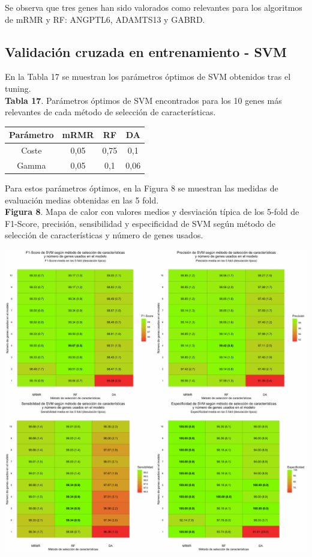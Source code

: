 Se observa que tres genes han sido valorados como relevantes para los algoritmos de mRMR y RF:  ANGPTL6, ADAMTS13 y GABRD.

\subsection{Validación cruzada en entrenamiento - SVM}

En la Tabla 17 se muestran los parámetros óptimos de SVM obtenidos tras el tuning.\\

\textbf{Tabla 17}. Parámetros óptimos de SVM encontrados para los 10 genes más relevantes de cada método de selección de características.

\begin{table}[H]
	\centering
	\begin{tabular}{cccc}
		\hline
		\textbf{Parámetro} & \textbf{mRMR} & \textbf{RF} & \textbf{DA} \\ \hline
		Coste                &    0,05 &    0,75     &   0,1       \\
		Gamma               &     0,05    &     0,1   & 0,06        \\ \hline
	\end{tabular}
\end{table}

Para estos parámetros óptimos, en la Figura 8 se muestran las medidas de evaluación medias obtenidas en las 5 fold.\\

\newpage
\textbf{Figura 8}. Mapa de calor con valores medios y desviación típica de los 5-fold de F1-Score, precisión, sensibilidad y especificidad de SVM según método de selección de características y número de genes usados.
\begin{center}
	\includegraphics[width=1\textwidth]{figuras/08_higado_biclase_heatmap_svm.pdf} 
\end{center}

